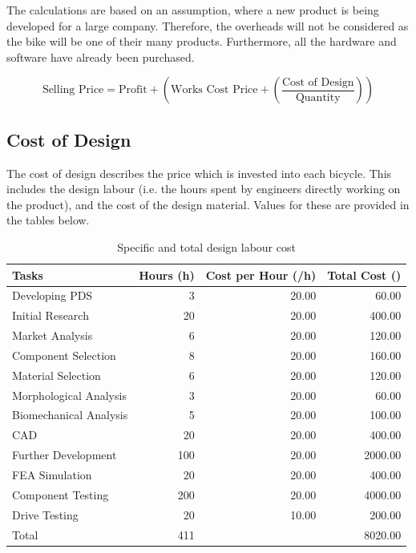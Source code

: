 \documentclass[a4paper,11pt]{article}
\begin{document}
The calculations are based on an assumption, where a new product is being developed for a large company. Therefore, the overheads will not be considered as the bike will be one of their many products. Furthermore, all the hardware and software have already been purchased. 

\[
	\text{Selling Price} = \text{Profit} + \left(\text{Works Cost Price} + \left(\frac{\text{Cost of Design}}{\text{Quantity}}\right)\right)
\]

\subsection{Cost of Design}

The cost of design describes the price which is invested into each bicycle. This includes the design labour (i.e. the hours spent by engineers directly working on the product), and the cost of the design material. Values for these are provided in the tables below.

\begin{table}[!ht]
	\centering
	\caption{Specific and total design labour cost}
	\begin{tabular}{l r r r}
		\hline
		\multicolumn{1}{l}{Tasks}&\multicolumn{1}{l}{Hours (h)}&\multicolumn{1}{l}{Cost per Hour (\textsterling/h)}&\multicolumn{1}{l}{Total Cost (\textsterling)}\\\hline
		Developing PDS	&3&20.00&60.00\\
		Initial Research&20&20.00&400.00\\
		Market Analysis&6&20.00&120.00\\
		Component Selection&8&20.00&160.00\\
		Material Selection&6&20.00&120.00\\
		Morphological Analysis&3&20.00&60.00\\
		Biomechanical Analysis&5&20.00&100.00\\
		CAD&20&20.00&400.00\\
		Further Development&100&20.00&2000.00\\
		FEA Simulation&20&20.00&400.00\\
		Component Testing&200&20.00&4000.00\\
		Drive Testing&20&10.00&200.00\\\hline
		Total&411&&8020.00\\\hline
	\end{tabular}
\end{table}
\end{document}
